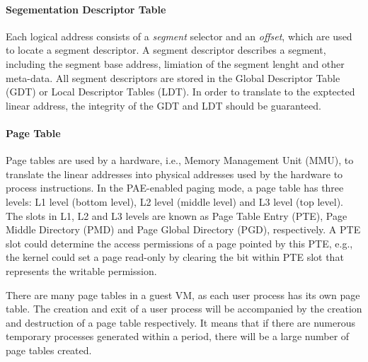 \paragraph{Segementation Descriptor Table}\label{sec:gdt}
Each logical address consists of a \emph{segment} selector and an \emph{offset}, which are used to locate a segment descriptor.
A segment descriptor describes a segment, including the segment base address, limiation of the segment lenght and other meta-data.
All segment descriptors are stored in the Global Descriptor Table (GDT) or Local Descriptor Tables (LDT). 
In order to translate to the exptected linear address, the integrity of the GDT and LDT should be guaranteed. 

\paragraph{Page Table}\label{sec:pagetable}
Page tables are used by a hardware, i.e., Memory Management Unit (MMU), to translate the linear addresses into physical addresses used by the hardware to process instructions.
In the PAE-enabled paging mode, a page table has three levels: L1 level (bottom level), L2 level (middle level) and L3 level (top level).
The slots in L1, L2 and L3 levels are known as Page Table Entry (PTE), Page Middle Directory (PMD) and Page Global Directory (PGD), respectively.
A PTE slot could determine the access permissions of a page pointed by this PTE, e.g., the kernel could set a page read-only by clearing the bit within PTE slot that represents the writable permission.

There are many page tables in a guest VM, as each user process has its own page table. 
The creation and exit of a user process will be accompanied by the creation and destruction of a page table respectively.
It means that if there are numerous temporary processes generated within a period, there will be a large number of page tables created. 

